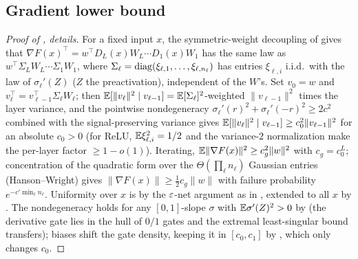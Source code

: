 \subsection{Gradient lower bound}
\begin{proof}[Proof of , details]
For a fixed input $x$, the symmetric-weight decoupling of \cite[Lemma 2.1]{bubeckCGT21} gives that
$\nabla F(x)^\top=w^\top D_L(x)W_L\cdots D_1(x)W_1$ has the same law as $w^\top\Sigma_LW_L\cdots\Sigma_1W_1$,
where $\Sigma_\ell=\operatorname{diag}(\xi_{\ell,1},\dots,\xi_{\ell,n_\ell})$ has entries $\xi_{\ell,i}$ i.i.d.\ with the
law of $\sigma_\ell'(Z)$ ($Z$ the preactivation), independent of the $W$'s. Set
$v_0=w$ and $v_\ell^\top=v_{\ell-1}^\top\Sigma_\ell W_\ell$; then
$\mathbb{E}[\|v_\ell\|^2\mid v_{\ell-1}]=\mathbb{E}[\Sigma_\ell]^2$-weighted $\|v_{\ell-1}\|^2$ times the layer variance,
and the pointwise nondegeneracy $\sigma_\ell'(r)^2+\sigma_\ell'(-r)^2\ge2c^2$ combined with the
signal-preserving variance gives $\mathbb{E}[\|v_\ell\|^2\mid v_{\ell-1}]\ge c_0^2\|v_{\ell-1}\|^2$ for an
absolute $c_0>0$ (for ReLU, $\mathbb{E}\xi_{\ell,i}^2=1/2$ and the variance-$2$ normalization make the per-layer
factor $\ge1-o(1)$). Iterating, $\mathbb{E}\|\nabla F(x)\|^2\ge c_g^2\|w\|^2$ with $c_g=c_0^L$; concentration of
the quadratic form over the $\Theta(\prod_\ell n_\ell)$ Gaussian entries (Hanson--Wright) gives
$\|\nabla F(x)\|\ge\tfrac12c_g\|w\|$ with failure probability $e^{-c'\min_\ell n_\ell}$. Uniformity over
$x$ is by the $\varepsilon$-net argument as in , extended to all $x$ by
. The nondegeneracy holds for any $[0,1]$-slope $\sigma$ with $\mathbb{E}\sigma'(Z)^2>0$ by
 (the derivative gate lies in the hull of $0/1$ gates and the extremal least-singular
bound transfers); biases shift the gate density, keeping it in $[c_0,c_1]$ by , which
only changes $c_0$.
\end{proof}

